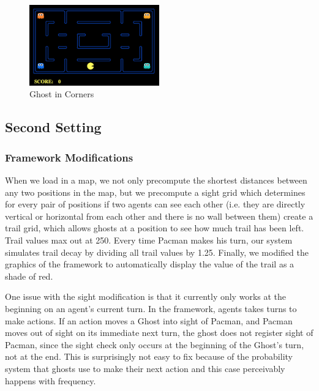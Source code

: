 \documentclass[11pt]{article}
\begin{document}
\begin{figure}[H]
	\includegraphics[width=0.5\textwidth]{mapcorners.png}
	\caption{Ghost in Corners}
	\label{fig:mapcorners}
\end{figure}


\subsection{Second Setting}

\subsubsection{Framework Modifications}
When we load in a map, we not only precompute the shortest distances between any two positions in the map, but we precompute a sight grid which determines for every pair of positions if two agents can see each other (i.e. they are directly vertical or horizontal from each other and there is no wall between them) create a trail grid, which allows ghosts at a position to see how much trail has been left. Trail values max out at 250. Every time Pacman makes his turn, our system simulates trail decay by dividing all trail values by 1.25.  Finally, we modified the graphics of the framework to automatically display the value of the trail as a shade of red.

One issue with the sight modification is that it currently only works at the beginning on an agent's current turn. In the framework, agents takes turns to make actions.  If an action moves a Ghost into sight of Pacman, and Pacman moves out of sight on its immediate next turn, the ghost does not register sight of Pacman, since the sight check only occurs at the beginning of the Ghost's turn, not at the end.  This is surprisingly not easy to fix because of the probability system that ghosts use to make their next action and this case perceivably happens with frequency.
\end{document}
